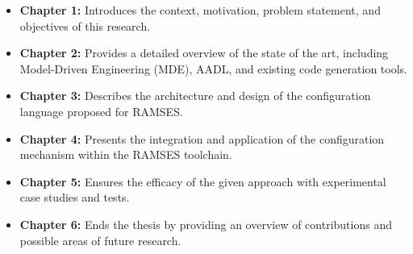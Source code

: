 \begin{itemize}
	\item \textbf{Chapter 1:} Introduces the context, motivation, problem statement, and objectives of this research.
	\item \textbf{Chapter 2:} Provides a detailed overview of the state of the art, including Model-Driven Engineering (MDE), AADL, and existing code generation tools.
	\item \textbf{Chapter 3:} Describes the architecture and design of the configuration language proposed for RAMSES.
	\item \textbf{Chapter 4:} Presents the integration and application of the configuration mechanism within the RAMSES toolchain.
	\item \textbf{Chapter 5:} Ensures the efficacy of the given approach with experimental case studies and tests.
	\item \textbf{Chapter 6:} Ends the thesis by providing an overview of contributions and possible areas of future research.
\end{itemize}










